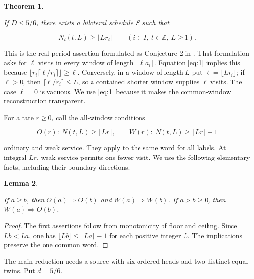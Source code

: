 \documentclass[11pt,a4paper]{article}
\newtheorem{theorem}{Theorem}
\newtheorem{lemma}[theorem]{Lemma}
\begin{document}
\begin{theorem}\label{stmt:1}

 If \(D\le5/6\), there exists a bilateral schedule \(S\) such that

\begin{equation}
N_i(t,L)\ge\lfloor Lr_i\rfloor
                 \qquad(i\in I,\ t\in\mathbb Z,\ L\ge1).
\tag{1}\label{eq:1}
\end{equation}

\end{theorem}

This is the real-period assertion formulated as Conjecture 2 in \cite{fujiwara-miyagi-ouchi}. That formulation asks for \(\ell\) visits in every window of length \(\lceil\ell a_i\rceil\). Equation \eqref{eq:1} implies this because \(\lfloor r_i\lceil\ell/r_i\rceil\rfloor\ge\ell\). Conversely, in a window of length \(L\) put \(\ell=\lfloor Lr_i\rfloor\); if \(\ell>0\), then \(\lceil\ell/r_i\rceil\le L\), so a contained shorter window supplies \(\ell\) visits. The case \(\ell=0\) is vacuous. We use \eqref{eq:1} because it makes the common-window reconstruction transparent.

For a rate \(r\ge0\), call the all-window conditions

\begin{equation}
O(r):\ N(t,L)\ge\lfloor Lr\rfloor,
 \qquad
 W(r):\ N(t,L)\ge\lceil Lr\rceil-1
\tag{2}\label{eq:2}
\end{equation}

ordinary and weak service. They apply to the same word for all labels. At integral \(Lr\), weak service permits one fewer visit. We use the following elementary facts, including their boundary directions.

\begin{lemma}\label{stmt:2}

 If \(a\ge b\), then \(O(a)\Rightarrow O(b)\) and \(W(a)\Rightarrow W(b)\). If \(a>b\ge0\), then \(W(a)\Rightarrow O(b)\).

\end{lemma}

\begin{proof}

 The first assertions follow from monotonicity of floor and ceiling. Since \(Lb<La\), one has \(\lfloor Lb\rfloor\le\lceil La\rceil-1\) for each positive integer \(L\). The implications preserve the one common word. 

\end{proof}

The main reduction needs a source with six ordered heads and two distinct equal twins. Put \(d=5/6\).
\end{document}
